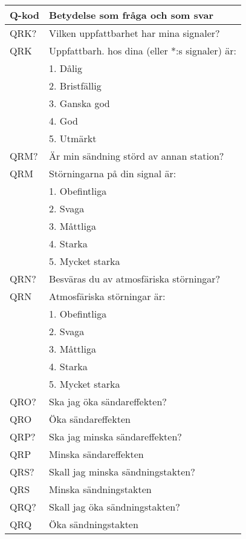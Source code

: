 \scriptsize
\begin{table}[h]
  \begin{tabular}{ll}
    Q-kod & Betydelse som fråga och som svar\\ \hline

    QRK?  & Vilken uppfattbarhet har mina signaler?\\
    QRK   & Uppfattbarh. hos dina (eller *:s signaler) är:\\
          & 1. Dålig\\
          & 2. Bristfällig\\
          & 3. Ganska god\\
          & 4. God\\
          & 5. Utmärkt\\ \hline

    QRM?  & Är min sändning störd av annan station?\\
    QRM   & Störningarna på din signal är:\\
          & 1. Obefintliga\\
          & 2. Svaga\\
          & 3. Måttliga\\
          & 4. Starka\\
          & 5. Mycket starka\\ \hline

    QRN?  & Besväras du av atmosfäriska störningar?\\
    QRN   & Atmosfäriska störningar är:\\
          & 1. Obefintliga\\
          & 2. Svaga\\
          & 3. Måttliga\\
          & 4. Starka\\
          & 5. Mycket starka\\ \hline

    QRO? & Ska jag öka sändareffekten?\\
    QRO  & Öka sändareffekten \\ \hline

    QRP? & Ska jag minska sändareffekten? \\
    QRP  & Minska sändareffekten \\ \hline

    QRS? & Skall jag minska sändningstakten?\\
    QRS  & Minska sändningstakten \\ \hline

    QRQ? & Skall jag öka sändningstakten?\\
    QRQ  & Öka sändningstakten\\ \hline


\end{tabular}
\end{table}
